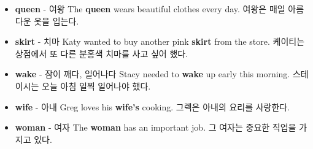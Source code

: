 \documentclass{article}
\begin{document}
\begin{addmargin}[1em]{1em}
\begin{itemize}
        \item \fontsize{12pt}{14pt}\selectfont \textbf{queen} - 여왕 \newline
        The \textbf{queen} wears beautiful clothes every day. \newline
        여왕은 매일 아름다운 옷을 입는다.

        \item \fontsize{12pt}{14pt}\selectfont \textbf{skirt} - 치마 \newline
        Katy wanted to buy another pink \textbf{skirt} from the store. \newline
        케이티는 상점에서 또 다른 분홍색 치마를 사고 싶어 했다.

        \item \fontsize{12pt}{14pt}\selectfont \textbf{wake} - 잠이 깨다, 일어나다 \newline
        Stacy needed to \textbf{wake} up early this morning. \newline
        스테이시는 오늘 아침 일찍 일어나야 했다.

        \item \fontsize{12pt}{14pt}\selectfont \textbf{wife} - 아내 \newline
        Greg loves his \textbf{wife's} cooking. \newline
        그렉은 아내의 요리를 사랑한다.

        \item \fontsize{12pt}{14pt}\selectfont \textbf{woman} - 여자 \newline
        The \textbf{woman} has an important job. \newline
        그 여자는 중요한 직업을 가지고 있다.
    \end{itemize}
\end{addmargin}

\newpage

\end{document}
